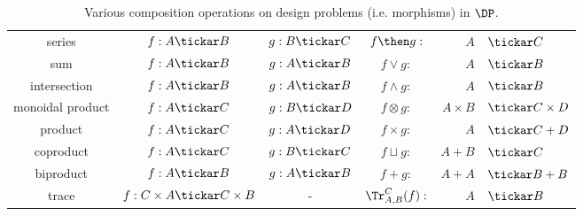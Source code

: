 \begin{table}[t!]
    \centering
\begin{tabular}{c|c|c|crl}
    series &
    $f:A\tickar B$&
    $g:B\tickar C$&
    $f\then g:$&$A$&$\tickar C$ \\
    sum &
    $f:A\tickar B$ &
    $g:A\tickar B$ &
    $f\vee g:$&$A$&$\tickar B$ \\
    intersection &
    $f:A\tickar B$ &
    $g:A\tickar B$ &
    $f\wedge g:$&$A$&$\tickar B$ \\
    monoidal product &
    $f:A\tickar C$&
    $g:B\tickar D$ &
    $f\otimes g:$&$A\times B$&$\tickar C \times D$ \\
    product &
    $f:A\tickar C$&
    $g:A\tickar D$ &
    $f\times g:$&$A $&$\tickar C + D$ \\
    coproduct &
    $f:A\tickar C$&
    $g:B\tickar C$ &
    $f\sqcup g:$&$A + B $&$\tickar C$ \\
    biproduct &
    $f:A\tickar B$ &
    $g:A\tickar B$ &
    $f+ g:$&$A + A$&$\tickar B + B$ \\
    trace &
    $f: C \times A \tickar C \times B$ &
    -&
    $\Tr_{A,B}^C(f) :$&$A$&$\tickar B$
\end{tabular}
    \caption{Various composition operations on design problems (i.e. morphisms) in $\DP$.}
\end{table}
